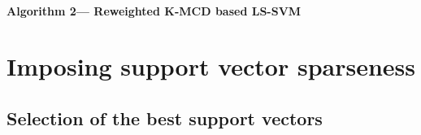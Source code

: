 \documentclass[preprint,12pt]{elsarticle}
\begin{document}






\paragraph{Algorithm 2--- Reweighted K-MCD based LS-SVM}

\newpage
\section{Imposing support vector sparseness}

\subsection{Selection of the best support vectors}
\end{document}
